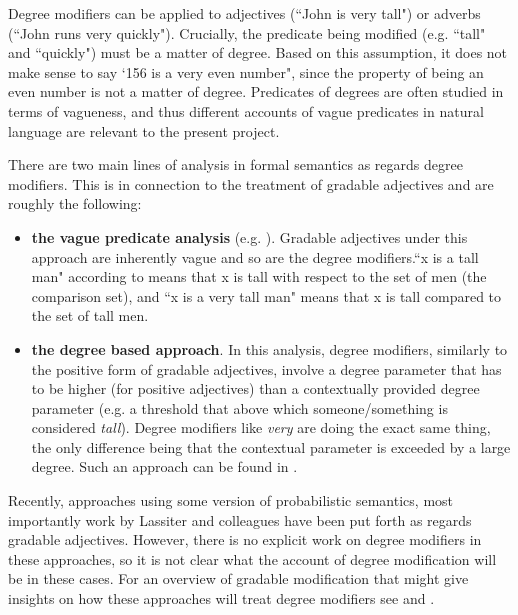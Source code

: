 \documentclass[11pt,a4paper]{article}
\begin{document}

Degree modifiers can be applied to adjectives (``John is very tall") or adverbs (``John runs very quickly"). Crucially, the predicate being modified (e.g. ``tall" and ``quickly") must be a matter of degree. Based on this assumption, it does not make sense to say `156 is a very even number", since the property of being an even number is not a matter of degree. Predicates of degrees are often studied in terms of vagueness, and thus different accounts of vague predicates in natural language are relevant to the present project. 







There are two main lines of analysis in formal semantics as regards degree modifiers. This is in connection to the treatment of gradable adjectives and are roughly the following:
\vspace{-2ex}
\begin{itemize}
\item \textbf{the vague predicate analysis} (e.g. ). Gradable adjectives under this approach are inherently vague and so are the degree modifiers.``x is a tall man" according to \cite{klein:1980}\/ means that x is tall with respect to the set of men (the comparison set), and ``x is a very tall man" means that x is tall compared to the set of tall men. 
\item \textbf{the degree based approach}. In this analysis, degree modifiers, similarly to the positive form of gradable adjectives, involve a degree parameter that has to be higher (for positive adjectives) than a contextually provided degree parameter (e.g. a threshold that above which someone/something is considered \textit{tall}). Degree modifiers like \emph{very} are doing the exact same thing, the only difference being that the contextual parameter is exceeded by a large degree. Such an approach can be found in \cite{kennedy:2005}. 
\end{itemize}
\vspace{-2ex}
Recently,  approaches using some version of probabilistic semantics, most importantly work by Lassiter and colleagues have been put forth as regards gradable adjectives. However, there is no explicit work on degree modifiers in these approaches, so it is not clear what the account of degree modification will be in these cases. For an overview of gradable modification that might give insights on how these approaches will treat degree modifiers see \cite{morzy:2015}\/ and \cite{lassiter:2014}.
\end{document}
